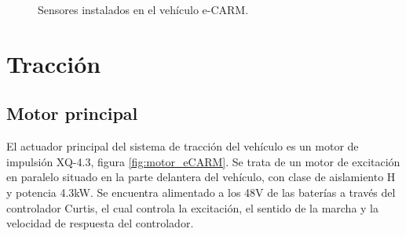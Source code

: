 \begin{figure}[!ht]
\centering
	\caption{Sensores instalados en el vehículo e-CARM.}
\end{figure}

\section{Tracción}
\subsection{Motor principal}\label{sec:3_Motor_principal}
El actuador principal del sistema de tracción del vehículo es un motor de impulsión XQ-4.3, figura \ref{fig:motor_eCARM}. Se trata de un motor de excitación en paralelo situado en la parte delantera del vehículo, con clase de aislamiento H y potencia 4.3kW. Se encuentra alimentado a los 48V de las baterías a través del controlador Curtis, el cual controla la excitación, el sentido de la marcha y la velocidad de respuesta del controlador.

